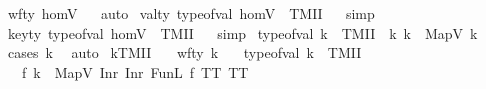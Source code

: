 \begin{isabellebody}
\isanewline
{}\isamarkupfalse%
\ {\isachardoublequoteopen}wf{\isacharunderscore}{\kern0pt}ty\ homV{\isachardoublequoteclose}%
\isadelimproof
\ %
\endisadelimproof
%
\isatagproof
{}\isamarkupfalse%
\ auto%
\endisatagproof
{\isafoldproof}%
%
\isadelimproof
%
\endisadelimproof
\isanewline
\isanewline
{}\isamarkupfalse%
\ {\isachardoublequoteopen}{\isacharparenleft}{\kern0pt}val{\isacharunderscore}{\kern0pt}ty\ {\isacharparenleft}{\kern0pt}type{\isacharunderscore}{\kern0pt}of{\isacharunderscore}{\kern0pt}val\ homV{\isacharparenright}{\kern0pt}\ {\isacharequal}{\kern0pt}\ TMII{\isacharparenright}{\kern0pt}{\isachardoublequoteclose}%
\isadelimproof
\ %
\endisadelimproof
%
\isatagproof
{}\isamarkupfalse%
\ simp%
\endisatagproof
{\isafoldproof}%
%
\isadelimproof
%
\endisadelimproof
\isanewline
\isanewline
{}\isamarkupfalse%
\ {\isachardoublequoteopen}{\isacharparenleft}{\kern0pt}key{\isacharunderscore}{\kern0pt}ty\ {\isacharparenleft}{\kern0pt}type{\isacharunderscore}{\kern0pt}of{\isacharunderscore}{\kern0pt}val\ homV{\isacharparenright}{\kern0pt}\ {\isacharequal}{\kern0pt}\ TMII{\isacharparenright}{\kern0pt}{\isachardoublequoteclose}%
\isadelimproof
\ %
\endisadelimproof
%
\isatagproof
{}\isamarkupfalse%
\ simp%
\endisatagproof
{\isafoldproof}%
%
\isadelimproof
%
\endisadelimproof
\isanewline
\isanewline
{}\isamarkupfalse%
\ {\isachardoublequoteopen}type{\isacharunderscore}{\kern0pt}of{\isacharunderscore}{\kern0pt}val\ k\ {\isacharequal}{\kern0pt}\ TMII\ {\isasymlongrightarrow}\ {\isacharparenleft}{\kern0pt}{\isasymexists}k{\isacharprime}{\kern0pt}{\isachardot}{\kern0pt}\ k\ {\isacharequal}{\kern0pt}\ MapV\ k{\isacharprime}{\kern0pt}{\isacharparenright}{\kern0pt}{\isachardoublequoteclose}%
\isadelimproof
\ %
\endisadelimproof
%
\isatagproof
{}\isamarkupfalse%
\ {\isacharparenleft}{\kern0pt}cases\ k{\isacharparenright}{\kern0pt}\ \isamarkupfalse%
\ auto%
\endisatagproof
{\isafoldproof}%
%
\isadelimproof
%
\endisadelimproof
\isanewline
\isanewline
{}\isamarkupfalse%
\ kTMII{\isacharcolon}{\kern0pt}\isanewline
\ \ \ {\isachardoublequoteopen}wf{\isacharunderscore}{\kern0pt}ty\ k{\isachardoublequoteclose}\isanewline
\ \ \ {\isachardoublequoteopen}type{\isacharunderscore}{\kern0pt}of{\isacharunderscore}{\kern0pt}val\ k\ {\isacharequal}{\kern0pt}\ TMII{\isachardoublequoteclose}\isanewline
\ \ \ {\isachardoublequoteopen}{\isasymexists}f{\isachardot}{\kern0pt}\ k\ {\isacharequal}{\kern0pt}\ MapV\ {\isacharparenleft}{\kern0pt}Inr\ {\isacharparenleft}{\kern0pt}Inr\ {\isacharparenleft}{\kern0pt}FunL\ f\ TT\ TT{\isacharparenright}{\kern0pt}{\isacharparenright}{\kern0pt}{\isacharparenright}{\kern0pt}{\isachardoublequoteclose}\isanewline

\end{isabellebody}
